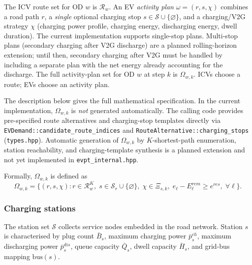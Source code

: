 The ICV route set for OD $w$ is $\mathcal{R}_w$.
An EV \emph{activity plan} $\omega = (r, s, \chi)$ combines a road
path $r$, a \emph{single} optional charging stop $s \in \mathcal{S} \cup \{\varnothing\}$,
and a charging/V2G strategy $\chi$ (charging power profile, charging energy,
discharging energy, dwell duration).
The current implementation supports single-stop plans.
Multi-stop plans (secondary charging after V2G discharge) are a planned
rolling-horizon extension; until then, secondary charging after V2G must
be handled by including a separate plan with the net energy already
accounting for the discharge.
The full activity-plan set for OD $w$ at step $k$ is $\Omega_{w,k}$.
ICVs choose a route; EVs choose an activity plan.

\begin{remark}
  The description below gives the full mathematical specification.
  In the current implementation, $\Omega_{w,k}$ is \emph{not} generated
  automatically.  The calling code provides pre-specified route
  alternatives and charging-stop templates directly via
  \texttt{EVDemand::candidate\_route\_indices} and
  \texttt{RouteAlternative::charging\_stops}
  (\texttt{types.hpp}).  Automatic generation of $\Omega_{w,k}$ by
  $K$-shortest-path enumeration, station reachability, and
  charging-template synthesis is a planned extension and not yet
  implemented in \texttt{evpt\_internal.hpp}.
\end{remark}

Formally, $\Omega_{w,k}$ is defined as
\begin{equation}
  \Omega_{w,k}
  =
  \bigl\{
    (r,s,\chi) :
    r\in\mathcal{R}^K_w,\;
    s\in\mathcal{S}_r\cup\{\varnothing\},\;
    \chi\in\Xi_{s,k},\;
    e_{\ell}-E^{rem}_{\ell}\ge e^{res},\;\forall\ell
  \bigr\}.
  \label{eq:plan-set}
\end{equation}

\subsubsection{Charging stations}

The station set $\mathcal{S}$ collects service nodes embedded in the
road network.  Station $s$ is characterised by plug count $\bar{B}_s$,
maximum charging power $\bar{p}^{ch}_s$, maximum discharging power
$\bar{p}^{dis}_s$, queue capacity $\bar{Q}_s$, dwell capacity $\bar{H}_s$,
and grid-bus mapping $\mathrm{bus}(s)$.


